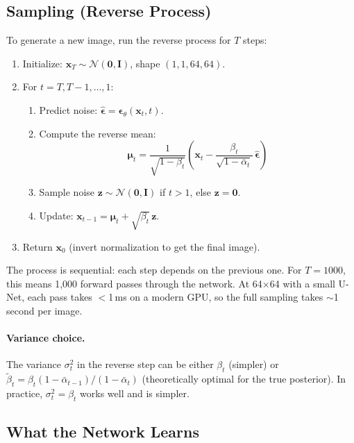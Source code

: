 \documentclass[11pt]{article}
\newcommand{\xb}{\mathbf{x}}
\newcommand{\eb}{\boldsymbol{\epsilon}}
\newcommand{\Ib}{\mathbf{I}}
\newcommand{\alphabar}{\bar{\alpha}}
\begin{document}
\subsection{Sampling (Reverse Process)}

To generate a new image, run the reverse process for $T$ steps:

\begin{enumerate}[nosep]
    \item Initialize: $\xb_T \sim \mathcal{N}(\mathbf{0}, \Ib)$, shape $(1, 1, 64, 64)$.
    \item For $t = T, T{-}1, \ldots, 1$:
    \begin{enumerate}[nosep]
        \item Predict noise: $\hat{\eb} = \eb_\theta(\xb_t, t)$.
        \item Compute the reverse mean:
              \[
                  \boldsymbol{\mu}_t = \frac{1}{\sqrt{1-\beta_t}}
                  \left(\xb_t - \frac{\beta_t}{\sqrt{1-\alphabar_t}}\,\hat{\eb}\right)
              \]
        \item Sample noise $\mathbf{z} \sim \mathcal{N}(\mathbf{0}, \Ib)$ if $t > 1$,
              else $\mathbf{z} = \mathbf{0}$.
        \item Update: $\xb_{t-1} = \boldsymbol{\mu}_t + \sqrt{\beta_t}\,\mathbf{z}$.
    \end{enumerate}
    \item Return $\xb_0$ (invert normalization to get the final image).
\end{enumerate}

The process is sequential: each step depends on the previous one. For $T = 1000$,
this means 1{,}000 forward passes through the network. At 64$\times$64 with a
small U-Net, each pass takes $<$1\,ms on a modern GPU, so the full sampling
takes $\sim$1 second per image.

\paragraph{Variance choice.}
The variance $\sigma_t^2$ in the reverse step can be either $\beta_t$ (simpler)
or $\tilde{\beta}_t = \beta_t(1-\alphabar_{t-1})/(1-\alphabar_t)$ (theoretically
optimal for the true posterior). In practice, $\sigma_t^2 = \beta_t$ works well
and is simpler.

\subsection{What the Network Learns}
\end{document}
